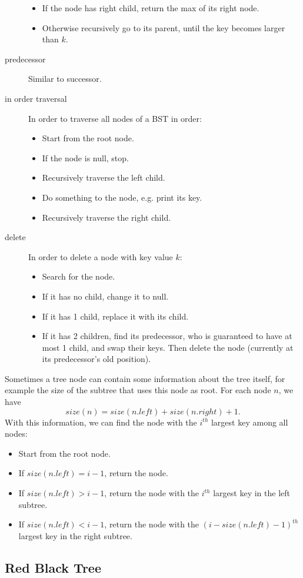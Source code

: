 \begin{description}
\begin{itemize}
\item If the node has right child, return the max of its right node.
\item Otherwise recursively go to its parent, until the key becomes larger than $k$.
\end{itemize}
\item[predecessor]Similar to successor.
\item[in order traversal]In order to traverse all nodes of a BST in order:
\begin{itemize}
\item Start from the root node.
\item If the node is null, stop.
\item Recursively traverse the left child.
\item Do something to the node, e.g. print its key.
\item Recursively traverse the right child.
\end{itemize}
\item[delete]In order to delete a node with key value $k$:
\begin{itemize}
\item Search for the node.
\item If it has no child, change it to null.
\item If it has 1 child, replace it with its child.
\item If it has 2 children, find its predecessor, who is guaranteed to have at most 1 child, and swap their keys. Then delete the node (currently at its predecessor's old position).
\end{itemize}
\end{description}
Sometimes a tree node can contain some information about the tree itself, for example the size of the subtree that uses this node as root. For each node $n$, we have
$$size(n) = size(n.left) + size(n.right) + 1.$$
With this information, we can find the node with the $i^{th}$ largest key among all nodes:
\begin{itemize}
\item Start from the root node.
\item If $size(n.left) = i - 1$, return the node.
\item If $size(n.left) > i - 1$, return the node with the $i^{th}$ largest key in the left subtree.
\item If $size(n.left) < i - 1$, return the node with the $(i-size(n.left)-1)^{th}$ largest key in the right subtree.
\end{itemize}
\subsection{Red Black Tree}
\ifx\PREAMBLE\undefined

\fi